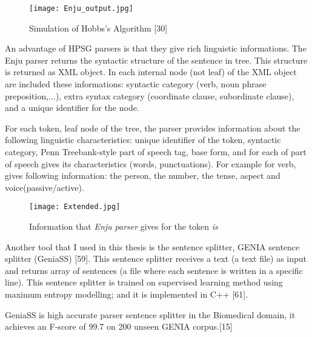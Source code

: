 \begin{figure}[h]
  \begin{center}
	\texttt{[image: Enju\_output.jpg]} 
 	\caption{Simulation of Hobbs's Algorithm [30] }
	\label{Figure 6}
  \end{center}
\end{figure}

An advantage of HPSG parsers is that they give rich linguistic informations. The Enju parser returns the syntactic structure of the sentence in tree. This structure is returned as XML object. In each internal node (not leaf) of the XML object are included these informations: syntactic category (verb, noun phrase preposition,...), extra syntax category (coordinate clause, subordinate clause), and a unique identifier for the node. 

For each token, leaf node of the tree, the parser provides information about the following linguistic characteristics: unique identifier of the token, syntactic category, Penn Treebank-style part of speech tag, base form, and for each of part of speech gives its characteristics (words, punctuations). For example for verb, gives following information: the person, the number, the tense, aspect and voice(passive/active). 

\newpage
\begin{figure}[h]
   \begin{center}
		\texttt{[image: Extended.jpg]} 
 		\caption[Information that \emph{Enju parser} gives for the token \emph{is}]{Information that \emph{Enju parser} gives for the token \emph{is}}
		\label{Figure 7}
	\end{center}
\end{figure}
 
Another tool that I used in this thesis is the sentence splitter, GENIA sentence splitter (GeniaSS) [59]. This sentence splitter receives a text (a text file) as input and returns array of sentences (a file where each sentence is written in a specific line). This sentence splitter is trained on supervised learning method using maximum entropy modelling; and it is implemented in C++ [61]. 

GeniaSS is high accurate parser sentence splitter in the Biomedical domain, it achieves an F-score of 99.7 on 200 unseen GENIA corpus.[15]
